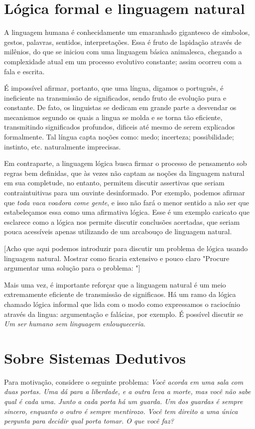 \section{Lógica formal e linguagem natural}
A linguagem humana é conhecidamente um emaranhado gigantesco de simbolos, gestos, palavras, sentidos, interpretações. Essa é fruto de lapidação através de milênios, do que se iniciou com uma linguagem básica animalesca, chegando a complexidade atual em um processo evolutivo constante; assim ocorreu com a fala e escrita.

É impossível afirmar, portanto, que uma língua, digamos o português, é ineficiente na transmissão de significados, sendo fruto de evolução pura e constante. De fato, os linguistas se dedicam em grande parte a desvendar os mecanismos segundo os quais a lingua se molda e se torna tão eficiente, transmitindo significados profundos, dificeis até mesmo de serem explicados formalmente. Tal língua capta noções como: medo; incerteza; possibilidade; instinto, etc. naturalmente imprecisas.

Em contraparte, a linguagem lógica busca firmar o processo de pensamento sob regras bem definidas, que às vezes não captam as noções da linguagem natural em sua completude, no entanto, permitem discutir assertivas que seriam contraintuitivas para um ouvinte desinformado. Por exemplo, podemos afirmar que \textit{toda vaca voadora come gente}, e isso não fará o menor sentido a não ser que estabeleçamos essa como uma afirmativa lógica. Esse é um exemplo caricato que esclarece como a lógica nos permite discutir conclusões acertadas, que seriam pouca acessíveis apenas utilizando de um arcabouço de linguagem natural.

[Acho que aqui podemos introduzir para discutir um problema de lógica usando linguagem natural. Mostrar como ficaria extensivo e pouco claro "Procure argumentar uma solução para o problema: "]

Mais uma vez, é importante reforçar que a linguagem natural é um meio extremamente eficiente de transmissão de significaos. Há um ramo da lógica chamado lógica informal que lida com o modo como expressamos o raciocínio através da lingua: argumentação e falácias, por exemplo. É possível discutir se \textit{Um ser humano sem linguagem enlouqueceria}.

\section{Sobre Sistemas Dedutivos}
Para motivação, considere o seguinte problema: \textit{Você acorda em uma sala com duas portas. Uma dá para a liberdade, e a outra leva a morte, mas você não sabe qual é cada uma. Junto a cada porta há um guarda. Um dos guardas é sempre sincero, enquanto o outro é sempre mentirozo. Você tem direito a uma única pergunta para decidir qual porta tomar. O que você faz?}

